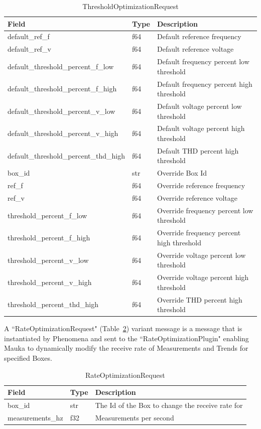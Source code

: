 \begin{table}[H]
	\centering
	\caption{ThresholdOptimizationRequest}
	\begin{tabularx}{\textwidth}{XlX}
		\toprule
		\textbf{Field} & \textbf{Type} & \textbf{Description} \\
		\midrule
		default\_ref\_f & f64 & Default reference frequency \\
		default\_ref\_v & f64 & Default reference voltage \\
		default\_threshold\_percent\_f\_low & f64 & Default frequency percent low threshold \\
		default\_threshold\_percent\_f\_high & f64 & Default frequency percent high threshold \\
		default\_threshold\_percent\_v\_low & f64 & Default voltage percent low threshold \\
		default\_threshold\_percent\_v\_high & f64 & Default voltage percent high threshold \\
		default\_threshold\_percent\_thd\_high & f64 & Default THD percent high threshold \\
		box\_id & str & Override Box Id \\
		ref\_f & f64 & Override reference frequency \\
		ref\_v & f64 & Override reference voltage \\
		threshold\_percent\_f\_low & f64 & Override frequency percent low threshold \\
		threshold\_percent\_f\_high & f64 & Override frequency percent high threshold \\
		threshold\_percent\_v\_low & f64 & Override voltage percent low threshold \\
		threshold\_percent\_v\_high & f64 & Override voltage percent high threshold \\
		threshold\_percent\_thd\_high & f64 & Override THD percent high threshold \\
		\bottomrule
	\end{tabularx}
	\label{table:ThresholdOptimziationRequest}
\end{table}

A ``RateOptimizationRequest" (Table~\ref{table:RateOptimizationRequest}) variant message is a message that is instantiated by Phenomena and sent to the ``RateOptimizationPlugin" enabling Mauka to dynamically modify the receive rate of Measurements and Trends for specified Boxes.

\begin{table}[H]
	\centering
	\caption{RateOptimizationRequest}
	\begin{tabularx}{\textwidth}{llX}
		\toprule
		\textbf{Field} & \textbf{Type} & \textbf{Description} \\
		\midrule
		box\_id & str & The Id of the Box to change the receive rate for \\
		measurements\_hz & f32 & Measurements per second \\
		\bottomrule
	\end{tabularx}
	\label{table:RateOptimizationRequest}
\end{table}

